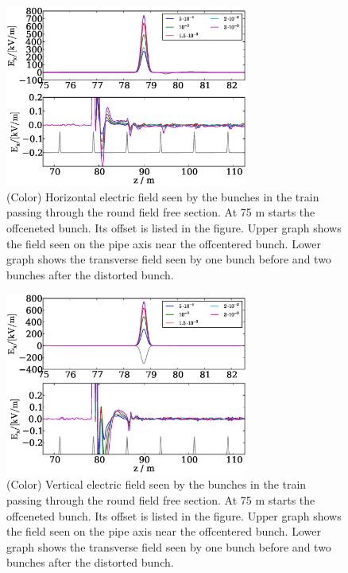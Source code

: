 \documentclass[5p]{elsarticle}%
\begin{document}
\begin{figure}[htb]
\centering
\includegraphics*[width=80mm]{data/round_dipole_xoffset.eps}
\caption{(Color) Horizontal electric field seen by the bunches in the train passing through the round field free section. At 75 m starts the offceneted bunch. Its offset is listed in the figure. Upper graph shows the field seen on the pipe axis near the offcentered bunch. Lower graph shows the transverse field seen by one bunch before and two bunches after the distorted bunch.}
\label{wake_dipole_x}
\end{figure}


\begin{figure}[htb]
\centering
\includegraphics*[width=80mm]{data/round_dipole_yoffset.eps}
\caption{(Color) Vertical electric field seen by the bunches in the train passing through the round field free section. At 75 m starts the offceneted bunch. Its offset is listed in the figure. Upper graph shows the field seen on the pipe axis near the offcentered bunch. Lower graph shows the transverse field seen by one bunch before and two bunches after the distorted bunch.}
\label{wake_dipole_y}
\end{figure}
\end{document}
